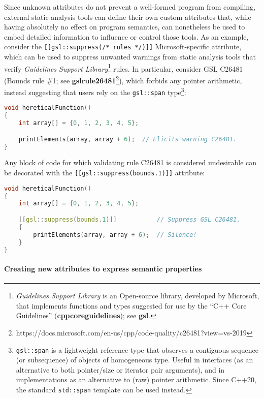 \documentclass[twoside,10pt,letterpaper,usenames]{newstyle-PearsonGeneric-7-38}
\begin{document}
Since unknown attributes do not prevent a well-formed program from
compiling, external static-analysis tools can define their own custom
attributes that, while having absolutely no effect on program semantics,
can nonetheless be used to embed detailed information to influence or
control those tools. As an example, consider the
\texttt{[[gsl::suppress(/*}~\texttt{rules}~\texttt{*/)]]}
Microsoft-specific attribute, which can be used to suppress unwanted
warnings from static analysis tools that verify \emph{Guidelines Support
Library}{\cprotect\footnote{\emph{Guidelines Support Library} is an
Open-source library, developed by Microsoft, that implements functions
and types suggested for use by the ``C++ Core Guidelines''
(\textbf{{cppcoreguidelines}}); see \textbf{{gsl}}.}} rules. In
particular, consider GSL C26481 (Bounds rule \#1; see
\textbf{{gslrule26481}}{\cprotect\footnote{https://docs.microsoft.com/en-us/cpp/code-quality/c26481?view=vs-2019}}),
which forbids any pointer arithmetic, instead suggesting that users rely
on the \texttt{gsl::span} type{\cprotect\footnote{\texttt{gsl::span} is
a lightweight reference type that observes a contiguous sequence (or
subsequence) of objects of homogeneous type. Useful in interfaces (as
an alternative to both pointer/size or iterator pair arguments), and
in implementations as an alternative to (raw) pointer arithmetic.
Since C++20, the standard \texttt{std::span} template can be used
instead.}}:

\begin{lstlisting}[language=C++]
void hereticalFunction()
{
    int array[] = {0, 1, 2, 3, 4, 5};

    printElements(array, array + 6);  // Elicits warning C26481.
}
\end{lstlisting}
    

Any block of code for which validating rule C26481 is considered
undesirable can be decorated with the
\texttt{[[gsl::suppress(bounds.1)]]} attribute:

\begin{lstlisting}[language=C++]
void hereticalFunction()
{
    int array[] = {0, 1, 2, 3, 4, 5};

    [[gsl::suppress(bounds.1)]]           // Suppress GSL C26481.
    {
        printElements(array, array + 6);  // Silence!
    }
}
\end{lstlisting}
    

\paragraph[Creating new attributes to express semantic properties]{Creating new attributes to express semantic properties}\label{creating-new-attributes-to-express-semantic-properties}
\end{document}
